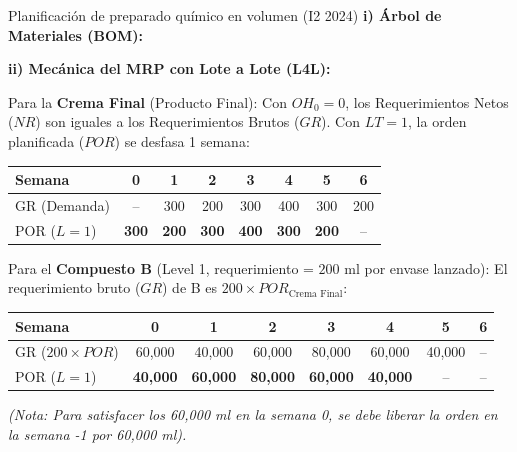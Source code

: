\begin{ejercicio}{Planificación de preparado químico en volumen (I2 2024)}
\textbf{i) Árbol de Materiales (BOM):}
\begin{center}
\end{center}

\textbf{ii) Mecánica del MRP con Lote a Lote (L4L):}

Para la \textbf{Crema Final} (Producto Final):
Con $OH_0=0$, los Requerimientos Netos ($NR$) son iguales a los Requerimientos Brutos ($GR$).
Con $LT = 1$, la orden planificada ($POR$) se desfasa 1 semana:
\begin{center}\small
\begin{tabular}{@{}lccccccc@{}}
  \toprule
  Semana & 0 & 1 & 2 & 3 & 4 & 5 & 6 \\
  \midrule
  GR (Demanda) & -- & 300 & 200 & 300 & 400 & 300 & 200 \\
  POR ($L=1$)  & \textbf{300} & \textbf{200} & \textbf{300} & \textbf{400} & \textbf{300} & \textbf{200} & -- \\
  \bottomrule
\end{tabular}
\end{center}

Para el \textbf{Compuesto B} (Level 1, requerimiento = $200\text{ ml}$ por envase lanzado):
El requerimiento bruto ($GR$) de B es $200 \times POR_{\text{Crema Final}}$:
\begin{center}\small
\begin{tabular}{@{}lccccccc@{}}
  \toprule
  Semana & 0 & 1 & 2 & 3 & 4 & 5 & 6 \\
  \midrule
  GR ($200\times POR$) & 60{,}000 & 40{,}000 & 60{,}000 & 80{,}000 & 60{,}000 & 40{,}000 & -- \\
  POR ($L=1$)          & \textbf{40{,}000} & \textbf{60{,}000} & \textbf{80{,}000} & \textbf{60{,}000} & \textbf{40{,}000} & -- & -- \\
  \bottomrule
\end{tabular}
\end{center}
\textit{(Nota: Para satisfacer los 60,000 ml en la semana 0, se debe liberar la orden en la semana -1 por 60,000 ml).}


\end{ejercicio}
